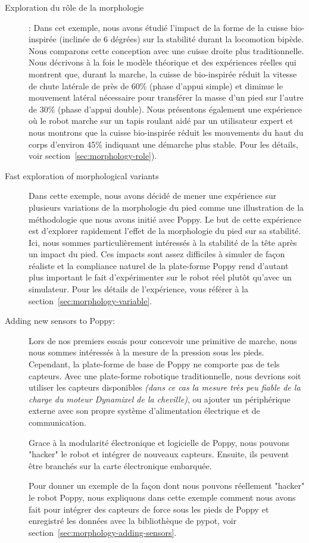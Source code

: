 \begin{description}
    \item[Exploration du rôle de la morphologie]: Dans cet exemple, nous avons étudié l'impact de la forme de la cuisse bio-inspirée (inclinée de 6 dégrées) sur la stabilité durant la locomotion bipède. Nous comparons cette conception avec une cuisse droite plus traditionnelle. Nous décrivons à la fois le modèle théorique et des expériences réelles qui montrent que, durant la marche, la cuisse de bio-inspirée réduit la vitesse de chute latérale de près de 60\% (phase d'appui simple) et diminue le mouvement latéral nécessaire pour transférer la  masse d'un pied sur l'autre de 30\% (phase d'appui double). Nous présentons également une expérience où le robot marche sur un tapis roulant aidé par un utilisateur expert et nous montrons que la cuisse bio-inspirée réduit les mouvements du haut du corps d'environ 45\% indiquant une démarche plus stable. Pour les détails, voir section~\ref{sec:morphology-role}).

    \item[Fast exploration of morphological variants] Dans cette exemple, nous avons décidé de mener une expérience sur plusieurs variations de la morphologie du pied comme une illustration de la méthodologie que nous avons initié avec Poppy.
    Le but de cette expérience est d'explorer rapidement l'effet de la morphologie du pied sur sa stabilité. Ici, nous sommes particulièrement intéressés à la stabilité de la tête après un impact du pied. Ces impacts sont assez difficiles à simuler de façon réaliste et la compliance naturel de la plate-forme Poppy rend d'autant plus important le fait d'expérimenter sur le robot réel plutôt qu'avec un simulateur. Pour les détails de l'expérience, vous référer à la section~\ref{sec:morphology-variable}.
    \item[Adding new sensors to Poppy:]Lors de nos premiers essais pour concevoir une primitive de marche, nous nous sommes intéressés à la mesure de la pression sous les pieds. Cependant, la plate-forme de base de Poppy ne comporte pas de tels capteurs. Avec une plate-forme robotique traditionnelle, nous devrions soit utiliser les capteurs disponibles \emph{(dans ce cas la mesure très peu fiable de la charge du moteur Dynamixel de la cheville)}, ou ajouter un périphérique externe avec son propre système d'alimentation électrique et de communication.

    Grace à la modularité électronique et logicielle de Poppy, nous pouvons "hacker" le robot et intégrer de nouveaux capteurs. Ensuite, ils peuvent être branchés sur la carte électronique embarquée.

    Pour donner un exemple de la façon dont nous pouvons réellement "hacker" le robot Poppy, nous expliquons dans cette exemple comment nous avons fait pour intégrer des capteurs de force sous les pieds de Poppy et enregistré les données avec la bibliothèque de pypot, voir section~\ref{sec:morphology-adding-sensors}.
\end{description}

